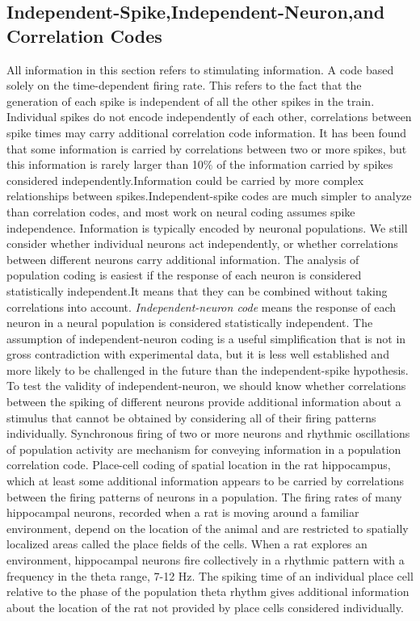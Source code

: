 \subsection{Independent-Spike,Independent-Neuron,and Correlation Codes}
\rem All information in this section refers to stimulating information.
A code based solely on the time-dependent firing rate. This refers to the fact that the generation of each spike is independent of all the other spikes in the train.
Individual spikes do not encode independently of each other, correlations between spike times may carry additional correlation code information.
\rem It has been found that some information is carried by correlations between two or more spikes, but this information is rarely larger than 10$\%$ of the information carried by spikes considered independently.Information could be carried by more complex relationships between spikes.Independent-spike codes are much simpler to analyze than correlation codes, and most work on neural coding assumes spike independence.
\rul Information is typically encoded by neuronal populations.
\rem We still consider whether individual neurons act independently, or whether correlations between different neurons carry additional information.
\rem The analysis of population coding is easiest if the response of each neuron is considered statistically independent.It means that they can be combined without taking correlations into account.
\emph{Independent-neuron code} means the response of each neuron in a neural population is considered statistically independent.
\rem The assumption of independent-neuron coding is a useful simplification that is not in gross contradiction with experimental data, but it is less well established and more likely to be challenged in the future than the independent-spike hypothesis.
\rem To test the validity of independent-neuron, we should know whether correlations between the spiking of different neurons provide additional information about a stimulus that cannot be obtained by considering all of their firing patterns individually.
\prin Synchronous firing of two or more neurons and rhythmic oscillations of population activity are mechanism for conveying information in a population correlation code.
\exm Place-cell coding of spatial location in the rat hippocampus, which at least some additional information appears to be carried by correlations between the firing patterns of neurons in a population. The firing rates of many hippocampal neurons, recorded when a rat is moving around a familiar environment, depend on the location of the animal and are restricted to spatially localized areas called the place fields of the cells. When a rat explores an environment, hippocampal neurons fire collectively in a rhythmic pattern with a frequency in the theta range, 7-12 Hz. The spiking time of an individual place cell relative to the phase of the population theta rhythm gives additional information about the location of the rat not provided by place cells considered individually.

